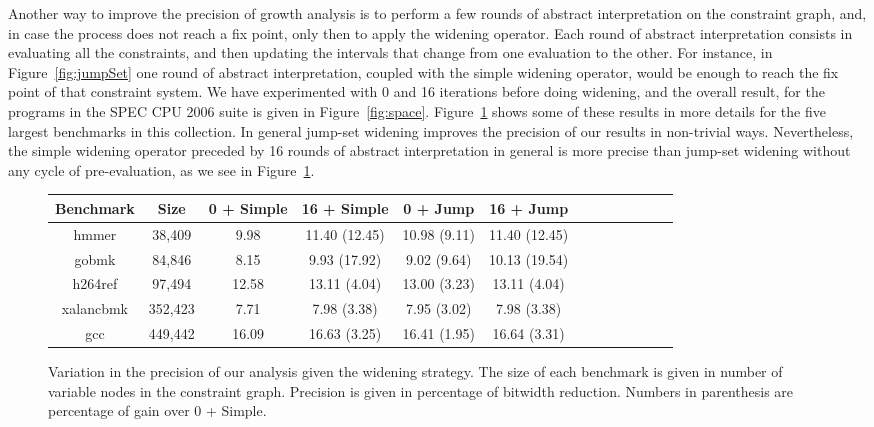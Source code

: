\documentclass[times]{speauth}
\begin{document}
Another way to improve the precision of growth analysis is to perform a few
rounds of abstract interpretation on the constraint graph, and, in case the
process does not reach a fix point, only then to apply the widening operator.
Each round of abstract interpretation consists in evaluating all the
constraints, and then updating the intervals that change from one evaluation to
the other.
For instance, in Figure~\ref{fig:jumpSet} one round of abstract interpretation,
coupled with the simple widening operator, would be enough to reach the
fix point of that constraint system.
We have experimented with 0 and 16 iterations before doing widening, and the
overall result, for the programs in the SPEC CPU 2006 suite is given in
Figure~\ref{fig:space}.
Figure~\ref{fig:wideningPrec} shows some of these results in more details
for the five largest benchmarks in this collection.
In general jump-set widening improves the precision of our results in
non-trivial ways.
Nevertheless, the simple widening operator preceded by 16 rounds of
abstract interpretation in general is more precise than jump-set widening
without any cycle of pre-evaluation, as we see in Figure~\ref{fig:wideningPrec}.

\begin{figure}[t!]
\begin{small}
\begin{center}
\renewcommand{\tabcolsep}{0.2cm}
\begin{tabular}{|c|c|c|c|c|c|c|c|c|c|c|c|c|} \hline
Benchmark &    Size & 0 + Simple &   16 + Simple &     0 + Jump & 16 + Jump \\ \hline
hmmer     &  38,409 &       9.98 & 11.40 (12.45) & 10.98 (9.11) & 11.40 (12.45) \\ \hline
gobmk     &  84,846 &       8.15 &  9.93 (17.92) &  9.02 (9.64) & 10.13 (19.54) \\ \hline
h264ref   &  97,494 &      12.58 &  13.11 (4.04) & 13.00 (3.23) & 13.11 (4.04) \\ \hline
xalancbmk & 352,423 &       7.71 &   7.98 (3.38) &  7.95 (3.02) & 7.98 (3.38) \\ \hline
gcc       & 449,442 &      16.09 &  16.63 (3.25) & 16.41 (1.95) & 16.64 (3.31) \\ \hline
\end{tabular}
\end{center}
\end{small}
\caption{\label{fig:wideningPrec}
Variation in the precision of our analysis given the widening strategy.
The size of each benchmark is given in number of variable nodes in the
constraint graph.
Precision is given in percentage of bitwidth reduction.
Numbers in parenthesis are percentage of gain over 0 + Simple.}
\end{figure}
\end{document}
